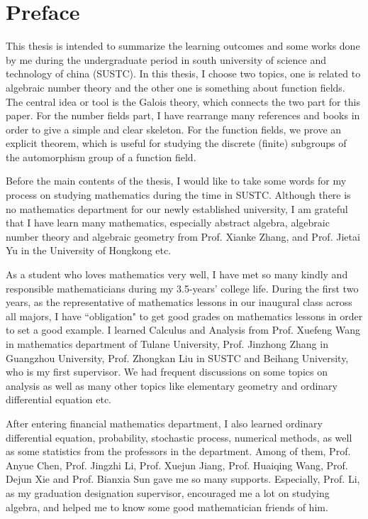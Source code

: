 \chapter{Preface}
\label{chap:chap-preface}
This thesis is intended to summarize the learning outcomes and some works done by me during the undergraduate period in south university of science and technology of china (SUSTC). In this thesis, I choose two topics, one is related to algebraic number theory and the other one is something about function fields. The central idea or tool is the Galois theory, which connects the two part for this paper. For the number fields part, I have rearrange many references and books in order to give a simple and clear skeleton. For the function fields, we prove an explicit theorem, which is useful for studying the discrete (finite) subgroups of the automorphism group of a function field.  

Before the main contents of the thesis, I would like to take some words for my process on studying mathematics during the time in SUSTC. Although there is no mathematics department for our newly established university, I am grateful that I have learn many mathematics, especially abstract algebra, algebraic number theory and algebraic geometry from Prof. Xianke Zhang, and  Prof. Jietai Yu in the University of Hongkong etc.

As a student who loves mathematics very well, I have met so many kindly and responsible mathematicians during my 3.5-years' college life. During the first two years, as the 
representative of mathematics lessons in our inaugural class across all majors, I have ``obligation" to get good grades on mathematics lessons in order to set a good example. I learned Calculus and Analysis from Prof. Xuefeng Wang in mathematics department of Tulane University, Prof. Jinzhong Zhang in Guangzhou University, Prof. Zhongkan Liu in SUSTC and Beihang University, who is my first supervisor. We had frequent discussions on some topics on analysis as well as many other topics like elementary geometry and ordinary differential equation etc. 

After entering financial mathematics department, I also learned ordinary differential equation, probability, stochastic process, numerical methods, as well as some statistics from the professors in the department. Among of them, Prof. Anyue Chen, Prof. Jingzhi Li, Prof. Xuejun Jiang, Prof. Huaiqing Wang, Prof. Dejun Xie and Prof. Bianxia Sun gave me so many supports. Especially, Prof. Li, as my graduation designation supervisor, encouraged me a lot on studying algebra, and helped me to know some good mathematician friends of him.

